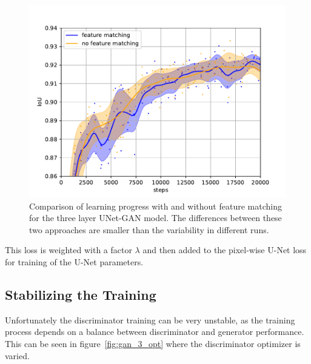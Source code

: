 \documentclass[aps,prl,twocolumn,groupedaddress,amsmath,amssymb]{revtex4-1}
\begin{document}
     \begin{figure}[tbp]
        \begin{center}
        \includegraphics[width=\linewidth]{figures/gan_3_no_fm.pdf}
        \end{center}
        \caption{Comparison of learning progress with and without feature matching for the three
        layer UNet-GAN model. The differences between these two approaches are smaller than the 
        variability in different runs.}
        \label{fig:gan_fm}
    \end{figure}

    This loss is weighted with a factor $\lambda$ and then added to the pixel-wise U-Net loss for 
    training of the U-Net parameters.

    \subsection{Stabilizing the Training}

    Unfortunately the discriminator training can be very unstable, as the training process
    depends on a balance between discriminator and generator performance. This can be seen in 
    figure~\ref{fig:gan_3_opt} where the discriminator optimizer is varied.
\end{document}
